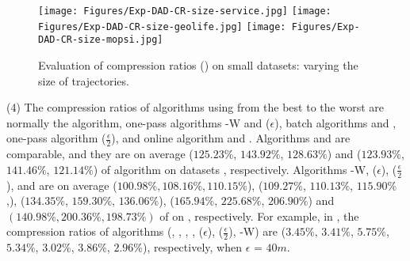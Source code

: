 \begin{figure*}[tb!]
	\centering
	\texttt{[image: Figures/Exp-DAD-CR-size-service.jpg]} 	\hspace{0.5ex}
	\texttt{[image: Figures/Exp-DAD-CR-size-geolife.jpg]}	\hspace{0.5ex}
	\texttt{[image: Figures/Exp-DAD-CR-size-mopsi.jpg]}		
	\vspace{-2ex}
	\caption{\small Evaluation of compression ratios (\dad) on small datasets: varying the size of trajectories.}
	\label{fig:cr-dad-size}
	\vspace{-2ex}
\end{figure*}




\sstab(4) The compression ratios of algorithms using \sed from the best
to the worst are normally the \opt algorithm, one-pass algorithms {\cised-W} and \cised($\epsilon$), batch algorithms \tpa and
\dpa, one-pass algorithm \cised($\frac{\epsilon}{2}$), and online algorithm {\dagots} and \squishe.
%
{Algorithms \tpa and \dpa are comparable, and they are on average
($125.23\%$, $143.92\%$, $128.63\%$) and ($123.93\%$, $141.46\%$, $121.14\%$)
 of algorithm \opt on datasets \dSets, respectively.}
%
{Algorithms {\cised-W}, \cised(${\epsilon}$), \cised($\frac{\epsilon}{2}$), \squishe and {\dagots} are on average {($100.98\%, 108.16\%, 110.15\%$)}, ($109.27\%$, $110.13\%$, $115.90\%$,), ($134.35\%$, $159.30\%$, $136.06\%$), ($165.94\%$, $225.68\%$, $206.90\%$) and {$(140.98\%, 200.36\%, 198.73\%)$}
 of \opt on \dSets, respectively.}
%
For example, in \mopsi, the compression ratios of algorithms
(\tpa, \dpa, \squishe, {\dagots}, \cised(${\epsilon}$), \cised($\frac{\epsilon}{2}$),  {\cised-W})
are ($3.45\%$, $3.41\%$, $5.75\%$, {$5.34\%$}, $3.02\%$, $3.86\%$,  {$2.96\%$}), respectively, when $\epsilon$ = $40m$.
%
%
%

